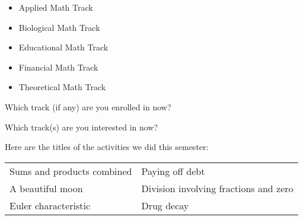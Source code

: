 \documentclass[handout,nooutcomes,space]{ximera}
\begin{document}
\begin{itemize}
\item Applied Math Track
\item Biological Math Track
\item Educational Math Track
\item Financial Math Track
\item Theoretical Math Track
\end{itemize}



\begin{question}
Which track (if any) are you enrolled in now?  
\begin{freeResponse}
\end{freeResponse}
\end{question}

\begin{question}
Which track(s) are you interested in now? 
\begin{freeResponse}
\end{freeResponse}
\end{question}

Here are the titles of the activities we did this semester:  


\begin{tabular}{ l l}
Sums and products combined  & 
Paying off debt \\
A beautiful moon &
Division involving fractions and zero \\
Euler characteristic &
Drug decay
\end{tabular}

\end{document}
